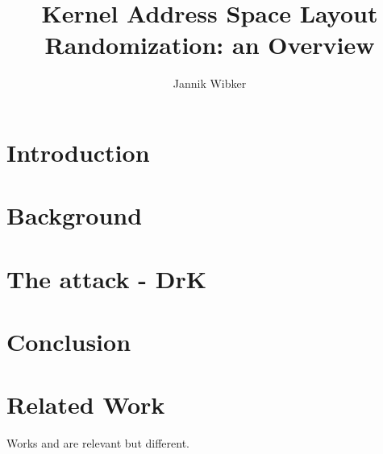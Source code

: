 \documentclass[10pt,twocolumn,a4paper]{article}
\author{Jannik Wibker}
\begin{document}
\title{ Kernel Address Space Layout Randomization: an Overview }

\newcommand{\todo}[1]{{\texttt{[#1]}}}
\newcommand{\code}[1]{{\tt \small{#1}}}

\maketitle

\begin{abstract}

\end{abstract}

\section{Introduction}\label{sec:introduction}
\section{Background}\label{sec:background}



\section{The attack - DrK}\label{sec:drk}




\section{Conclusion}\label{sec:conclusion}



\section{Related Work}\label{sec:relwork}

Works \cite{xen03virtualization} and \cite{pratt2005xaa} are relevant but
different.



\end{document}

